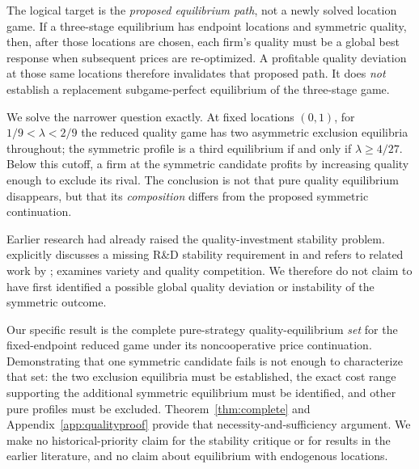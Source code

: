 \documentclass[11pt]{article}
\begin{document}
The logical target is the \emph{proposed equilibrium path},
not a newly solved location game. If a three-stage
equilibrium has endpoint locations and symmetric quality,
then, after those locations are chosen, each firm's
quality must be a global best response when subsequent
prices are re-optimized. A profitable quality deviation
at those same locations therefore invalidates that
proposed path. It does \emph{not} establish a replacement
subgame-perfect equilibrium of the three-stage game.

We solve the narrower question exactly. At fixed
locations $(0,1)$, for $1/9<\lambda<2/9$ the reduced
quality game has two asymmetric exclusion equilibria
throughout; the symmetric profile is a third equilibrium
if and only if $\lambda\geq4/27$. Below this cutoff, a
firm at the symmetric candidate profits by increasing
quality enough to exclude its rival. The conclusion is
not that pure quality equilibrium disappears, but that
its \emph{composition} differs from the proposed
symmetric continuation.

Earlier research had already raised the quality-investment
stability problem. \citet[chap.~3]{Bunte1997} explicitly
discusses a missing R\&D stability requirement in
\citet{Economides1989} and refers to related work by
\citet{Sorenson1995}; \citet{Bunte1995} examines
variety and quality competition. We therefore do
not claim to have first identified a possible
global quality deviation or instability of the
symmetric outcome.

Our specific result is the complete pure-strategy
quality-equilibrium \emph{set} for the fixed-endpoint
reduced game under its noncooperative price
continuation. Demonstrating that one symmetric
candidate fails is not enough to characterize that
set: the two exclusion equilibria must be established,
the exact cost range supporting the additional
symmetric equilibrium must be identified, and
other pure profiles must be excluded. Theorem~\ref{thm:complete}
and Appendix~\ref{app:qualityproof} provide
that necessity-and-sufficiency argument. We make
no historical-priority claim for the stability
critique or for results in the earlier literature,
and no claim about equilibrium with endogenous
locations.
\end{document}
